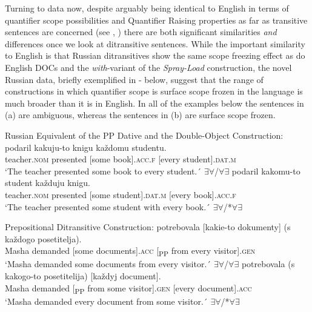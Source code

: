 \documentclass[output=paper,colorlinks,citecolor=brown,nonflat]{./langscibook}
\begin{document}
Turning to data now, despite arguably being identical to English in terms of quantifier scope possibilities and Quantifier Raising properties as far as transitive sentences are concerned (see \citealt{Antonyuk-Yudina2006, Antonyuk2015}, \citeyear{Antonyuk2019}) there are both significant similarities \textit{and} differences once we look at ditransitive sentences. While the important similarity to English is that Russian ditransitives show the same scope freezing effect as do English DOCs and the \textit{with}-variant of the \textit{Spray-Load} construction, the novel Russian data, briefly exemplified in - below, suggest that the range of constructions in which quantifier scope is surface scope frozen in the language is much broader than it is in English. In all of the examples below the sentences in (a) are ambiguous, whereas the sentences in (b) are surface scope frozen.

\ea%
    \label{ex:antonyuk:2}
    Russian Equivalent of the PP Dative and the Double-Object Construction:
    \ea \label{ex:antonyuk:2a}
         {podaril}      {kakuju-to}   {knigu}    {každomu} {studentu}.\\
    teacher.\textsc{nom} presented [some   book].\textsc{acc.f}  [every student].\textsc{dat.m}\\
    \glt `The teacher presented some book to every student.´ \hfill ${\exists}{\forall}$/${\forall}{\exists}$
    \ex \label{ex:antonyuk:2b}
              {podaril}      {kakomu-to} {student}     {každuju} {knigu}.\\
    teacher.\textsc{nom} presented [some         student].\textsc{dat.m}   [every book].\textsc{acc.f}\\
    \glt `The teacher presented some student with every book.´ \hfill ${\exists}{\forall}$/*${\forall}{\exists}$
    \z
\z


\ea%
    \label{ex:antonyuk:3}
    Prepositional Ditransitive Construction:
    \ea \label{ex:antonyuk:3a}
       {potrebovala}  {[kakie-to} {dokumenty]}  {}   {(s}  {každogo}  posetitelja).\\
    Masha demanded     [some documents].\textsc{acc} [\textsubscript{PP} from every visitor].\textsc{gen}\\
    \glt `Masha demanded some documents from every visitor.´ \hfill ${\exists}{\forall}$/${\forall}{\exists}$
    \ex \label{ex:antonyuk:3b}
       {potrebovala} {}   {(s} {kakogo-to} {posetitelija)} {[každyj} {document]}.\\
    Masha demanded [\textsubscript{PP} from some   visitor].\textsc{gen} [every document].\textsc{acc}\\
    \glt `Masha demanded every document from some visitor.´ \hfill ${\exists}{\forall}$/*${\forall}{\exists}$
    \z
\z
\end{document}

